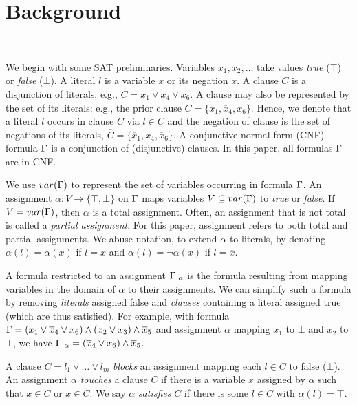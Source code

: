 \section{Background}~\label{sec:background}

We begin with some SAT preliminaries. Variables $x_1, x_2, \dots$ take values
\emph{true} ($\top$) or \emph{false} ($\bot$). A literal $l$ is a variable $x$
or its negation $\overline{x}$. A clause $C$ is a disjunction of literals, e.g.,
$C = x_1 \lor \overline{x}_4 \lor x_6$. A clause may also be represented by the
set of its literals: e.g., the prior clause $C = \{x_1, \overline{x}_4, x_6\}$.
Hence, we denote that a literal $l$ occurs in clause $C$ via $l \in C$ and the
negation of clause is the set of negations of its literals, $\overline{C} =
\{\overline{x}_1, x_4, \overline{x}_6\}$. A conjunctive normal form (CNF)
formula $\Gamma$ is a conjunction of (disjunctive) clauses. In this paper, all
formulas $\Gamma$ are in CNF.

We use $var(\Gamma)$ to represent the set of variables occurring in formula
$\Gamma$. An assignment $\alpha : V \rightarrow \{\top, \bot\}$ on
$\Gamma$ maps variables $V \subseteq var(\Gamma)$ to \emph{true} or \emph{false}. If $V =
var(\Gamma)$, then $\alpha$ is a total assignment. Often, an assignment that 
is not total is called a \emph{partial assignment}. For this paper, assignment 
refers to both total and partial assignments. We abuse notation, to
extend $\alpha$ to literals, by denoting $\alpha(l) = \alpha(x)$
if $l = x$ and $\alpha(l) = \neg \alpha(x)$ if $l = \overline{x}$.

A formula restricted to an assignment $\Gamma|_\alpha$ is the formula
resulting from mapping variables in the domain of $\alpha$ to their assignments.
We can simplify such a formula by removing \emph{literals} assigned false and
\emph{clauses} containing a literal assigned true (which are thus satisfied). For
example, with formula $\Gamma = (x_1 \lor \overline{x}_4 \lor x_6) \land (x_2
\lor x_3) \land \overline{x}_5$ and assignment $\alpha$ mapping $x_1$ to $\bot$
and $x_2$ to $\top$, we have $\Gamma|_\alpha = (\overline{x}_4 \lor x_6) \land
\overline{x}_5$.

A clause $C = l_1 \lor \dots \lor l_m$ \emph{blocks} an assignment
mapping each $l \in C$ to false ($\bot$). An assignment $\alpha$ \emph{touches}
a clause $C$ if there is a variable $x$ assigned by $\alpha$ such that $x \in C$
or $\overline{x} \in C$. We say $\alpha$ \emph{satisfies} $C$ if there is some
$l \in C$ with $\alpha(l) = \top$.

